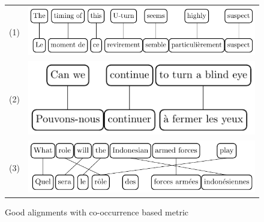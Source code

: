 \documentclass[output=paper,modfonts,nonflat]{langsci/langscibook}
\begin{document}
\begin{figure}
\centering
\begin{tabular}{lC}
(1) & \includegraphics[scale=.9]{figures/figSemmar} \\[1ex]
(2) & \includegraphics[scale=.9]{figures/figSemmar2}\\[1ex]
(3) & \includegraphics[scale=.9]{figures/figSemmar3}\\
\end{tabular}
\caption{\label{sem:fig:goodali}Good alignments with co-occurrence based metric}
\end{figure}
\end{document}

